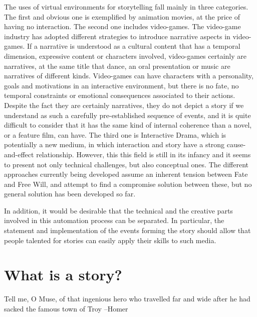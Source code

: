 \documentclass[
		twoside,openright,titlepage,numbers=noenddot,manychapters,
		headinclude,%
                footinclude=false,cleardoublepage=empty,
                BCOR=5mm,
		fontsize=11pt, %
                 enabledeprecatedfontcommands]{scrreprt}
\begin{document}
The uses of virtual environments for storytelling fall mainly in three categories. The first and obvious one is exemplified by animation movies, at the price of having no interaction. The second one includes video-games. The video-game industry has adopted different strategies to introduce narrative aspects in video-games. If a narrative is understood as a cultural content that has a temporal dimension, expressive content or characters involved, video-games certainly are narratives, at the same title that dance, an oral presentation or music are narratives of different kinds. Video-games can have  characters with a personality, goals and motivations in an interactive environment, but there is no fate, no temporal constraints or emotional consequences associated to their actions. Despite the fact they are certainly narratives, they do not depict a story if we understand as such a carefully pre-established sequence of events, and it is quite difficult to consider that it has the same kind of internal coherence than a novel, or a feature film, can have. 
The third one is Interactive Drama, which is potentially a new medium, in which interaction and story have a strong cause-and-effect relationship. However, this this field is still in its infancy and it seems to present not only technical challenges, but also conceptual ones. The different approaches currently being developed  assume an inherent tension between Fate and Free Will, and attempt to find a compromise solution between these, but no general solution has been developed so far.



In addition,  it would be desirable that the technical and the creative parts involved in this automation process can be separated. In particular, the statement and implementation of the events forming the story should allow that people talented for stories can easily apply their skills to such media.


\cleardoublepage





\chapter{What is a story?}
\thispagestyle{empty}
\label{ch_story_def}


\begin{origquote}
Tell me, O Muse, of that ingenious hero who travelled far and wide after he had sacked the famous town of Troy  --Homer \cite[]{homer_oh}
\end{origquote}
\end{document}
